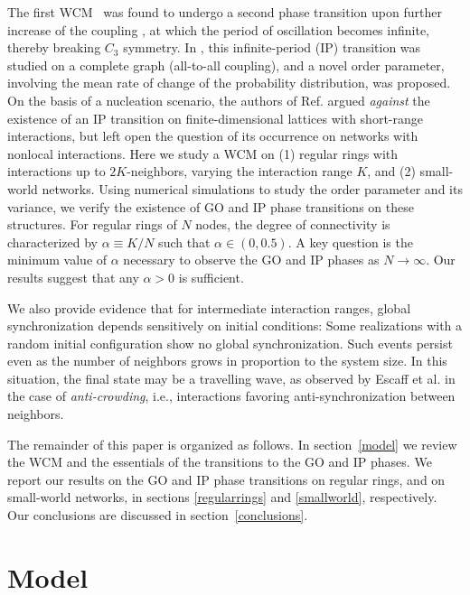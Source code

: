 The first WCM~\cite{Wood06a} was found to undergo a second phase transition upon further increase of the coupling
\cite{assis2011infinite}, at which the period of oscillation becomes infinite, thereby breaking $C_3$ symmetry. In
\cite{assis2011infinite}, this infinite-period (IP) transition was studied on a complete graph (all-to-all coupling), and a novel order
parameter, involving the mean rate of change of the probability distribution, was proposed. On the basis of a nucleation scenario, the
authors of Ref. \cite{assis2011infinite} argued \textit{against} the existence of an IP transition on finite-dimensional lattices with
short-range interactions, but left open the question of its occurrence on networks with nonlocal interactions. Here we study a WCM on
(1) regular rings with interactions up to $2K$-neighbors, varying the interaction range $K$, and (2) small-world networks. Using
numerical simulations to study the order parameter and its variance, we verify the existence of GO and IP phase transitions on these
structures. For regular rings of $N$ nodes, the degree of connectivity is characterized by $\alpha \equiv K/N$ such that $\alpha \in
(0, 0.5)$.  A key question is the minimum value of $\alpha$ necessary to observe the GO and IP phases as $N \to \infty$.  Our results
suggest that any $\alpha > 0$ is sufficient.

We also provide evidence that for intermediate interaction ranges, global synchronization depends sensitively on initial conditions:
Some realizations with a random initial configuration show no global synchronization. Such events persist even as the number of
neighbors grows in proportion to the system size.  In this situation, the final state may be a travelling wave, as observed by Escaff
et al. \cite{escaff2014arrays} in the case of \textit{anti-crowding}, i.e., interactions favoring anti-synchronization between
neighbors.

The remainder of this paper is organized as follows. In section~\ref{model} we review the WCM and the essentials of the transitions to
the GO and IP phases.  We report our results on the GO and IP phase transitions on regular rings, and on small-world networks, in
sections \ref{regularrings} and \ref{smallworld}, respectively.  Our conclusions are discussed in section~\ref{conclusions}.


\section{\label{model} Model}


